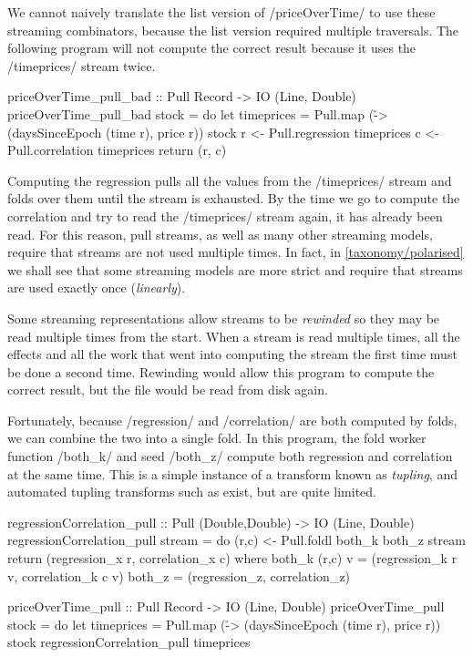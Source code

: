 We cannot naively translate the list version of \Hs/priceOverTime/ to use these streaming combinators, because the list version required multiple traversals.
The following program will not compute the correct result because it uses the \Hs/timeprices/ stream twice.

\begin{haskell}
priceOverTime_pull_bad :: Pull Record -> IO (Line, Double)
priceOverTime_pull_bad stock = do
  let timeprices = Pull.map (\r -> (daysSinceEpoch (time r), price r)) stock
  r <- Pull.regression  timeprices
  c <- Pull.correlation timeprices
  return (r, c)
\end{haskell}

Computing the regression pulls all the values from the \Hs/timeprices/ stream and folds over them until the stream is exhausted.
By the time we go to compute the correlation and try to read the \Hs/timeprices/ stream again, it has already been read.
For this reason, pull streams, as well as many other streaming models, require that streams are not used multiple times.
In fact, in \autoref{taxonomy/polarised} we shall see that some streaming models are more strict and require that streams are used exactly once (\emph{linearly}).

Some streaming representations allow streams to be \emph{rewinded} so they may be read multiple times from the start.
When a stream is read multiple times, all the effects and all the work that went into computing the stream the first time must be done a second time.
Rewinding would allow this program to compute the correct result, but the file would be read from disk again.

Fortunately, because \Hs/regression/ and \Hs/correlation/ are both computed by folds, we can combine the two into a single fold.
In this program, the fold worker function \Hs/both_k/ and seed \Hs/both_z/ compute both regression and correlation at the same time.
This is a simple instance of a transform known as \emph{tupling}, and automated tupling transforms such as \cite{hu1997tupling} exist, but are quite limited.

\begin{haskell}
regressionCorrelation_pull :: Pull (Double,Double) -> IO (Line, Double)
regressionCorrelation_pull stream = do
  (r,c) <- Pull.foldl both_k both_z stream
  return (regression_x r, correlation_x c)
 where
  both_k (r,c) v = (regression_k r v, correlation_k c v)
  both_z         = (regression_z,     correlation_z)

priceOverTime_pull :: Pull Record -> IO (Line, Double)
priceOverTime_pull stock = do
  let timeprices = Pull.map (\r -> (daysSinceEpoch (time r), price r)) stock
  regressionCorrelation_pull timeprices
\end{haskell}


